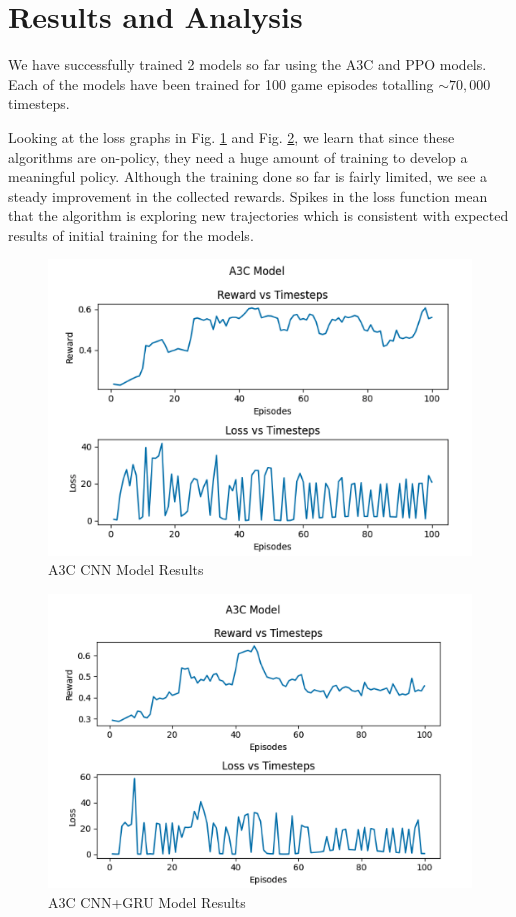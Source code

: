 \documentclass[conference]{IEEEtran}
\begin{document}
\section{Results and Analysis}

We have successfully trained 2 models so far using the A3C and PPO models. Each of the models have been trained for 100 game episodes totalling $\sim70,000$ timesteps.

Looking at the loss graphs in Fig. \ref{a3c_cnn_result} and Fig. \ref{a3c_gru_result}, we learn that since these algorithms are on-policy, they need a huge amount of training to develop a meaningful policy. Although the training done so far is fairly limited, we see a steady improvement in the collected rewards. Spikes in the loss function mean that the algorithm is exploring new trajectories which is consistent with expected results of initial training for the models.

\begin{figure}[h!]
    \centering
    \includegraphics[width=\linewidth]{a3c_cnn_result.png}
    \caption{A3C CNN Model Results}
    \label{a3c_cnn_result}
\end{figure}

\begin{figure}[h!]
    \centering
    \includegraphics[width=\linewidth]{a3c_gru_result.png}
    \caption{A3C CNN+GRU Model Results}
    \label{a3c_gru_result}
\end{figure}
\end{document}
